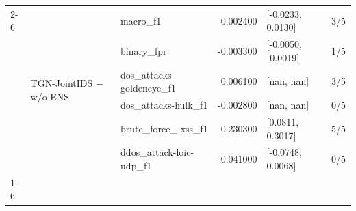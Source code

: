 \begin{table}
\begin{tabular}{lllrll}
\cline{2-6}
 & \multirow[t]{6}{*}{TGN-JointIDS − w/o ENS} & macro\_f1 & 0.002400 & [-0.0233, 0.0130] & 3/5 \\
 &  & binary\_fpr & -0.003300 & [-0.0050, -0.0019] & 1/5 \\
 &  & dos\_attacks-goldeneye\_f1 & 0.006100 & [nan, nan] & 3/5 \\
 &  & dos\_attacks-hulk\_f1 & -0.002800 & [nan, nan] & 0/5 \\
 &  & brute\_force\_-xss\_f1 & 0.230300 & [0.0811, 0.3017] & 5/5 \\
 &  & ddos\_attack-loic-udp\_f1 & -0.041000 & [-0.0748, 0.0068] & 0/5 \\
\cline{1-6} \cline{2-6}
\bottomrule
\end{tabular}
\end{table}
